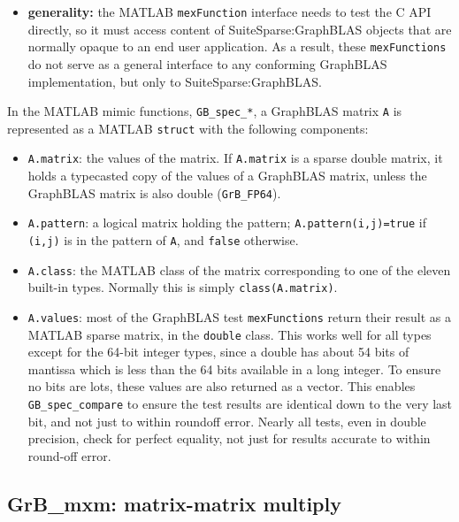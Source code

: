 \documentclass[12pt]{article}
\begin{document}
\begin{itemize}
\item {\bf generality:} the MATLAB \verb'mexFunction' interface needs to
    test the C API directly, so it must access content of SuiteSparse:GraphBLAS
    objects that are normally opaque to an end user application.  As a result,
    these \verb'mexFunctions' do not serve as a general interface to any
    conforming GraphBLAS implementation, but only to SuiteSparse:GraphBLAS.

\end{itemize}

In the MATLAB mimic functions, \verb'GB_spec_*', a GraphBLAS matrix \verb'A' is
represented as a MATLAB \verb'struct' with the following components:

\begin{itemize}
\item \verb'A.matrix':  the values of the matrix.  If \verb'A.matrix' is a
    sparse double matrix, it holds a typecasted copy of the values of a
    GraphBLAS matrix, unless the GraphBLAS matrix is also double
    (\verb'GrB_FP64').

\item \verb'A.pattern': a logical matrix holding the pattern;
    \verb'A.pattern(i,j)=true' if \verb'(i,j)' is in the pattern of \verb'A',
    and \verb'false' otherwise.

\item \verb'A.class': the MATLAB class of the matrix corresponding to one of
    the eleven built-in types.  Normally this is simply \verb'class(A.matrix)'.

\item \verb'A.values': most of the GraphBLAS test \verb'mexFunctions' return
    their result as a MATLAB sparse matrix, in the \verb'double' class.  This
    works well for all types except for the 64-bit integer types, since a
    double has about 54 bits of mantissa which is less than the 64 bits
    available in a long integer.  To ensure no bits are lots, these values are
    also returned as a vector.  This enables \verb'GB_spec_compare' to ensure
    the test results are identical down to the very last bit, and not just to
    within roundoff error.  Nearly all tests, even in double precision, check
    for perfect equality, not just for results accurate to within round-off
    error.

\end{itemize}

\newpage
\subsection{{\sf GrB\_mxm:} matrix-matrix multiply} %
\label{mxm}
\end{document}
